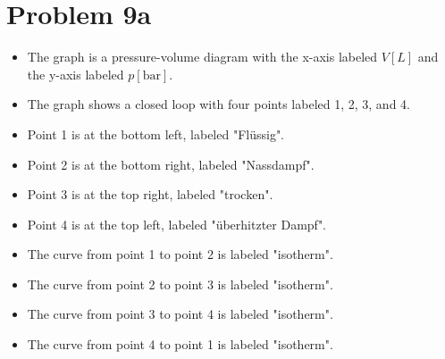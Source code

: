 \section*{Problem 9a}
\begin{itemize}
    \item The graph is a pressure-volume diagram with the x-axis labeled \( V [L] \) and the y-axis labeled \( p [\text{bar}] \).
    \item The graph shows a closed loop with four points labeled 1, 2, 3, and 4.
    \item Point 1 is at the bottom left, labeled "Flüssig".
    \item Point 2 is at the bottom right, labeled "Nassdampf".
    \item Point 3 is at the top right, labeled "trocken".
    \item Point 4 is at the top left, labeled "überhitzter Dampf".
    \item The curve from point 1 to point 2 is labeled "isotherm".
    \item The curve from point 2 to point 3 is labeled "isotherm".
    \item The curve from point 3 to point 4 is labeled "isotherm".
    \item The curve from point 4 to point 1 is labeled "isotherm".
\end{itemize}